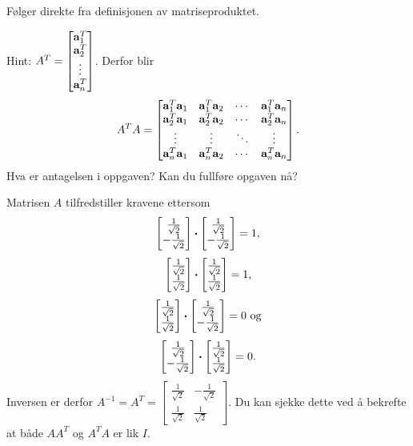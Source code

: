 \begin{losning}

\begin{punkt}
Følger direkte fra definisjonen av matriseproduktet.
\end{punkt}


\begin{punkt}
Hint: $A^T=\begin{bmatrix}
\mathbf{a}_1^T\\
\mathbf{a}_2^T\\
\vdots\\
\mathbf{a}_n^T
\end{bmatrix}$. Derfor blir
$$A^TA=\begin{bmatrix}
\mathbf{a}_1^T \mathbf{a}_1 & \mathbf{a}_1^T \mathbf{a}_2 & \cdots & \mathbf{a}_1^T\mathbf{a}_n\\
\mathbf{a}_2^T \mathbf{a}_1 & \mathbf{a}_2^T \mathbf{a}_2 & \cdots & \mathbf{a}_2^T\mathbf{a}_n\\
\vdots & \vdots & \ddots & \vdots\\
\mathbf{a}_n^T \mathbf{a}_1 & \mathbf{a}_n^T \mathbf{a}_2 & \cdots & \mathbf{a}_n^T\mathbf{a}_n
\end{bmatrix}.
$$ Hva er antagelsen i oppgaven? Kan du fullføre opgaven nå?

\end{punkt}


\begin{punkt}
Matrisen $A$ tilfredstiller kravene ettersom $$\begin{bmatrix} \frac{1}{\sqrt{2}} \\ -\frac{1}{\sqrt{2}} \end{bmatrix}\boldsymbol{\cdot} \begin{bmatrix} \frac{1}{\sqrt{2}} \\ -\frac{1}{\sqrt{2}} \end{bmatrix}=1,$$ $$\begin{bmatrix} \frac{1}{\sqrt{2}} \\ \frac{1}{\sqrt{2}} \end{bmatrix}\boldsymbol{\cdot}  \begin{bmatrix} \frac{1}{\sqrt{2}} \\ \frac{1}{\sqrt{2}} \end{bmatrix}=1,$$ $$\begin{bmatrix} \frac{1}{\sqrt{2}} \\ \frac{1}{\sqrt{2}} \end{bmatrix}\boldsymbol{\cdot}  \begin{bmatrix} \frac{1}{\sqrt{2}} \\ -\frac{1}{\sqrt{2}} \end{bmatrix}=0 \text{ og}$$ $$\begin{bmatrix} \frac{1}{\sqrt{2}} \\ -\frac{1}{\sqrt{2}} \end{bmatrix}\boldsymbol{\cdot}  \begin{bmatrix} \frac{1}{\sqrt{2}} \\ \frac{1}{\sqrt{2}} \end{bmatrix}=0.$$ Inversen er derfor $A^{-1}=A^T=\begin{bmatrix}
\frac{1}{\sqrt{2}} & -\frac{1}{\sqrt{2}}\\
\frac{1}{\sqrt{2}} & \frac{1}{\sqrt{2}}
\end{bmatrix}.$ Du kan sjekke dette ved å bekrefte at både $AA^T$ og $A^TA$ er lik $I$.
\end{punkt}


\end{losning}



